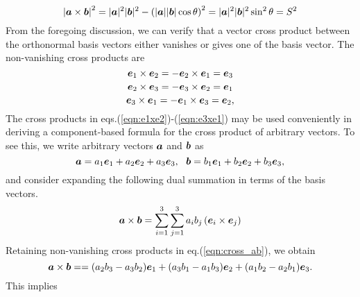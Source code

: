 \documentclass[10pt,a4j]{article}
\begin{document}
\begin{equation}
    \left|\mbox{\boldmath $a$}\times \mbox{\boldmath $b$} \right|^2
    =
    |\mbox{\boldmath $a$}|^2|\mbox{\boldmath $b$}|^2-
    \left(
    |\mbox{\boldmath $a$}||\mbox{\boldmath $b$}|\cos\theta \right)^2
    = |\mbox{\boldmath $a$}|^2|\mbox{\boldmath $b$}|^2\sin^2\theta
    =S^2
    \label{eqn:}
\end{equation}
From the foregoing discussion, we can verify that a vector cross product between the orthonormal basis vectors either vanishes or gives one of the basis vector. The non-vanishing cross products are
\begin{equation}
    \mbox{\boldmath $e$}_1 \times  \mbox{\boldmath $e$}_2=
    -\mbox{\boldmath $e$}_2 \times  \mbox{\boldmath $e$}_1=
    \mbox{\boldmath $e$}_3
    \label{eqn:e1xe2}
\end{equation}
\begin{equation}
    \mbox{\boldmath $e$}_2 \times  \mbox{\boldmath $e$}_3= 
    -\mbox{\boldmath $e$}_3 \times  \mbox{\boldmath $e$}_2=\mbox{\boldmath $e$}_1
    \label{eqn:e2xe3}
\end{equation}
\begin{equation}
    \mbox{\boldmath $e$}_3 \times  \mbox{\boldmath $e$}_1
    =
    -\mbox{\boldmath $e$}_1 \times  \mbox{\boldmath $e$}_3=\mbox{\boldmath $e$}_2,
    \label{eqn:e3xe1}
\end{equation}
The cross products in eqs.(\ref{eqn:e1xe2})-(\ref{eqn:e3xe1}) may be used conveniently in deriving a component-based formula for the cross product of arbitrary vectors. To see this, we write arbitrary vectors $\mbox{\boldmath $a$}$ and $\mbox{\boldmath $b$}$ as
\begin{equation}
    \fat{a}=
    a_1\fat{e}_1 + a_2\fat{e}_2 + a_3\fat{e}_3, \ \ 
    \fat{b}=
    b_1\fat{e}_1 + b_2\fat{e}_2 + b_3\fat{e}_3,
    \label{eqn:}
\end{equation}
and consider expanding the following dual summation in terms of the basis vectors.
\begin{equation}
    \mbox{\boldmath $a$}\times \mbox{\boldmath $b$} = 
    \sum_{i=1}^3
    \sum_{j=1}^3
    a_ib_j \left(\mbox{\boldmath $e$}_i\times \mbox{\boldmath $e$}_j\right) 
    \label{eqn:cross_ab}
\end{equation}
Retaining non-vanishing cross products in eq.(\ref{eqn:cross_ab}), we obtain
\begin{equation}
    \mbox{\boldmath $a$}\times \mbox{\boldmath $b$} = 
    =
    (a_2b_3-a_3b_2)\mbox{\boldmath $e$}_1
    +
    (a_3b_1-a_1b_3)\mbox{\boldmath $e$}_2
    +
    (a_1b_2-a_2b_1)\mbox{\boldmath $e$}_3.
    \label{eqn:cross_ab_worked}
\end{equation}
This implies 
\end{document}
